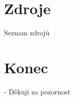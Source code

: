 \documentclass[aspectratio=169]{beamer}
\begin{document}
\section{Zdroje}

\begin{frame}[allowframebreaks]{Seznam zdrojů}
    \printbibliography
\end{frame}






\section{Konec}

\begin{frame}{-}
    \centering
    Děkuji za pozornost
\end{frame}
\end{document}
